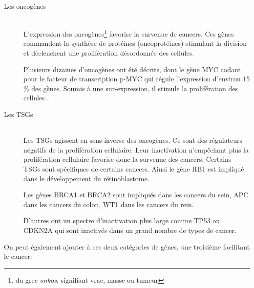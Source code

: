       \begin{description}
        \item [Les oncogènes] \hfill \\
          L'expression des oncogènes\footnote{du grec \emph{onkos}, signifiant vrac, masse ou tumeur} favorise la survenue de cancers.
          Ces gènes commandent la synthèse de protéines (oncoprotéines) stimulant la division et déclenchent une prolifération désordonnée des cellules.

          Plusieurs dizaines d'oncogènes ont été décrits, dont le gène \acs{MYC} codant pour le facteur de transcription \acs{p-MYC} qui régule l'expression d'environ 15 \% des gènes.
          Soumis à une sur-expression, il stimule la prolifération des cellules \citep{Li2003}.

        \item [Les \acp{TSG}] \hfill \\
          Les \acp{TSG} agissent en sens inverse des oncogènes.
          Ce sont des régulateurs négatifs de la prolifération cellulaire.
          Leur inactivation n'empêchant plus la prolifération cellulaire favorise donc la survenue des cancers.
          Certains \acp{TSG} sont spécifiques de certains cancers.
          Ainsi le gène \acs{RB1} est impliqué dans le développement du rétinoblastome.

          Les gènes \acs{BRCA1} et \acs{BRCA2} sont impliqués dans les cancers du sein, \acs{APC} dans les cancers du colon, \acs{WT1} dans les cancers du rein.

          D'autres ont un spectre d'inactivation plus large comme \acs{TP53} ou \acs{CDKN2A} qui sont inactivés dans un grand nombre de types de cancer.

      \end{description}
      \vspace{1.5ex}

      On peut également ajouter à ces deux catégories de gènes, une troisième facilitant le cancer:

